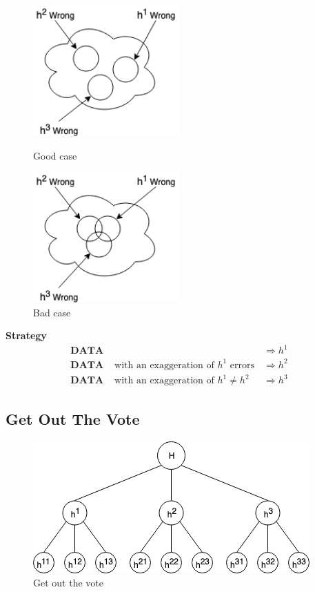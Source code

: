 \documentclass[12pt]{book}
\begin{document}
\begin{figure}[htbp]
	\centering
	\begin{minipage}[t]{0.48\textwidth}
		\centering
		\includegraphics[height=5cm]{Figure/Figure17_2.png}
		\caption{Good case}
	\end{minipage}
	\begin{minipage}[t]{0.48\textwidth}
		\centering
		\includegraphics[height=5cm]{Figure/Figure17_3.png}
		\caption{Bad case}
	\end{minipage}
\end{figure}
\newline
\indent \textbf{Strategy}
\begin{equation*}
\begin{aligned}
	\textbf{DATA}& &\Longrightarrow h^1\\
	\textbf{DATA}&\text{ with an exaggeration of $h^1$ errors} &\Longrightarrow h^2\\
	\textbf{DATA}&\text{ with an exaggeration of $h^1\neq h^2$ } &\Longrightarrow h^3
\end{aligned}
\end{equation*}
\newpage
\subsection{Get Out The Vote}
\begin{figure}[ht]
	\centering
	\includegraphics[scale=0.6]{Figure/Figure17_4.png}
	\caption{Get out the vote}
\end{figure}
\end{document}
